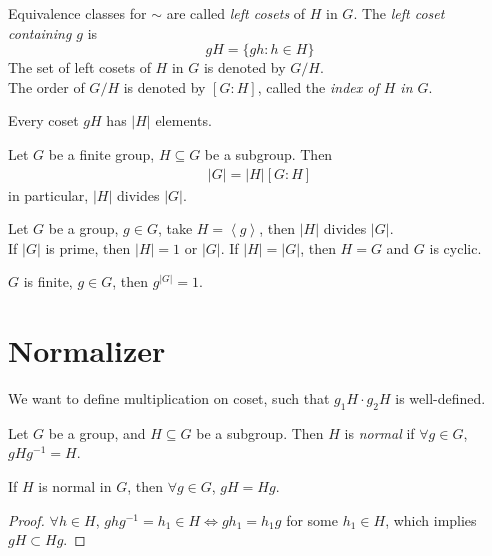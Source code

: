 \begin{definition}
Equivalence classes for $\sim $ are called \textit{left cosets}  of $H$ in $G$.
The \textit{left coset containing $g$} is 
$$
gH = \{ gh : h \in H \}
$$
The set of left cosets of $H$ in $G$ is denoted by $G/H$.
\\The order of $G/H$ is denoted by $[G:H]$, called the \textit{index of $H$ in $G$}.
\end{definition}

\begin{lemma}
Every coset $gH$ has $|H|$ elements.
\end{lemma}

\begin{theorem}
Let $G$ be a finite group, $H \subseteq G$ be a subgroup.
Then
\begin{align}
    \left| G \right| = \left| H \right| \left[ G:H \right]
\end{align}
in particular, $|H|$ divides $|G|$.
\end{theorem}

\begin{corollary}
Let $G$ be a group, $g \in G$, take $H = \left<g \right>$, then $|H|$ divides $|G|$.
\\ If $|G|$ is prime, then $|H| = 1$ or $|G|$. If $|H| = |G|$, then $H = G$ and $G$ is cyclic.
\end{corollary}

\begin{corollary}
$G$ is finite, $g \in G$, then $g^{|G|} = 1$.
\end{corollary}



\newpage

\section{Normalizer} \label{sec:}

We want to define multiplication on coset, such that $g_1H \cdot  g_2H$ is well-defined.

\begin{definition}[Normal]
Let $G$ be a group, and $H \subseteq G$ be a subgroup. Then $H$ is \textit{normal} if $\forall g \in G$, $gHg^{-1} = H$.
\end{definition}

\begin{prop}
If $H$ is normal in $G$, then $\forall g \in G$, $gH = Hg$.
\end{prop}
\begin{proof}
$\forall h \in H$, $ghg^{-1} = h_1 \in H \iff gh_1 = h_1g$ for some $h_1 \in H$, which implies $gH \subset Hg$.
\end{proof}

